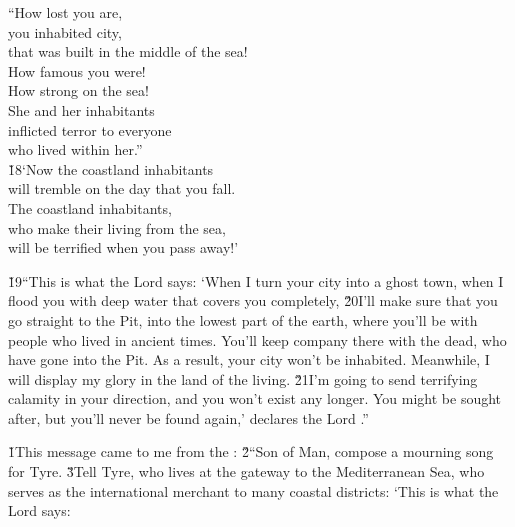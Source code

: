 \begin{poetry}
\poeml ``How lost you are, \\
\poemll    you inhabited city, \\
\poemlll       that was built in the middle of the sea! \\
\poeml How famous you were! \\
\poemll    How strong on the sea! \\
\poeml She and her inhabitants \\
\poemll    inflicted terror to everyone \\
\poemlll       who lived within her.'' \\
\poeml \v{18}`Now the coastland inhabitants \\
\poemll    will tremble on the day that you fall. \\
\poeml The coastland inhabitants, \\
\poemll    who make their living from the sea, \\
\poemlll       will be terrified when you pass away!'
\end{poetry}

\v{19}``This is what the Lord  says: `When I turn your city into a ghost town, when I flood you with deep water that covers you completely, \v{20}I'll make sure that you go straight to the Pit, into the lowest part of the earth, where you'll be with people who lived in ancient times. You'll keep company there with the dead, who have gone into the Pit. As a result, your city won't be inhabited. Meanwhile, I will display my glory in the land of the living. \v{21}I'm going to send terrifying calamity in your direction, and you won't exist any longer. You might be sought after, but you'll never be found again,' declares the Lord .''

\v{1}This message came to me from the : \v{2}``Son of Man, compose a mourning song for Tyre. \v{3}Tell Tyre, who lives at the gateway to the Mediterranean Sea, who serves as the international merchant to many coastal districts: `This is what the Lord  says:

